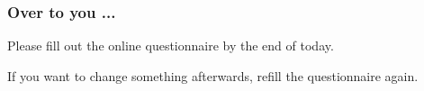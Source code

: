 % 
% 

\begin{frame}\frametitle{Over to you ...}
	Please fill out the online questionnaire by the end of today.
	
	\vspace{12pt}
	If you want to change something afterwards, refill the questionnaire again.
\end{frame}

